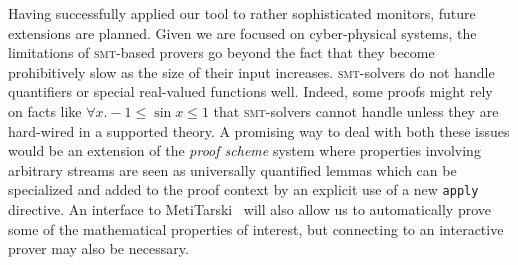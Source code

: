 Having successfully applied our tool to rather
sophisticated monitors,  future extensions are planned.  Given we are
focused on  cyber-physical systems,  the limitations
of  \textsc{smt}-based provers go  beyond the fact that they become prohibitively slow as the
size of their input increases.  
\textsc{smt}-solvers do not handle quantifiers  or special real-valued
functions well. Indeed, some
proofs might rely on facts like $\forall x. -1 \leq \sin x \leq 1$
that  \textsc{smt}-solvers cannot  handle unless they are hard-wired in
a supported theory. A promising way to deal with both these issues
would be an extension of the \textit{proof scheme} system where
properties involving arbitrary streams are seen as universally
quantified lemmas which can be specialized and added to the proof
context by an explicit use of a new \texttt{apply} directive.  An interface to 
MetiTarski~\cite{AkbarpourPaulson} will also allow us to automatically
prove some of
the mathematical properties of interest, but connecting to an
interactive prover may also be necessary. 


